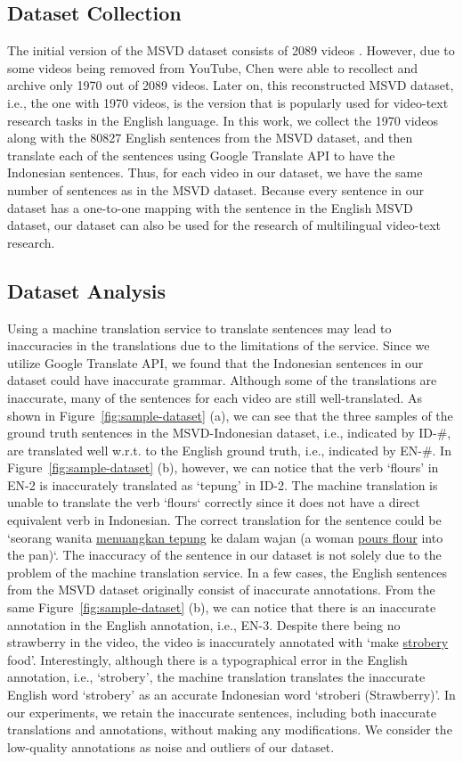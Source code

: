 \documentclass{article}
\begin{document}
\subsection{Dataset Collection}
The initial version of the MSVD dataset consists of 2089 videos \cite{chen:acl11}. However, due to some videos being removed from YouTube, Chen \etal were able to recollect and archive only 1970 out of 2089 videos. Later on, this reconstructed MSVD dataset, i.e., the one with 1970 videos, is the version that is popularly used for video-text research tasks in the English language. In this work, we collect the 1970 videos along with the 80827 English sentences from the MSVD dataset, and then translate each of the sentences using Google Translate API to have the Indonesian sentences. Thus, for each video in our dataset, we have the same number of sentences as in the MSVD dataset. Because every sentence in our dataset has a one-to-one mapping with the sentence in the English MSVD dataset, our dataset can also be used for the research of multilingual video-text research.

\subsection{Dataset Analysis}
Using a machine translation service to translate sentences may lead to inaccuracies in the translations due to the limitations of the service.  Since we utilize Google Translate API, we found that the Indonesian sentences in our dataset could have inaccurate grammar. Although some of the translations are inaccurate, many of the sentences for each video are still well-translated. As shown in Figure~\ref{fig:sample-dataset} (a), we can see that the three samples of the ground truth sentences in the MSVD-Indonesian dataset, i.e., indicated by ID-\#, are translated well w.r.t. to the English ground truth, i.e., indicated by EN-\#. In Figure~\ref{fig:sample-dataset} (b), however, we can notice that the verb `flours' in EN-2 is inaccurately translated as `tepung' in ID-2. The machine translation is unable to translate the verb `flours` correctly since it does not have a direct equivalent verb in Indonesian. The correct translation for the sentence could be `seorang wanita \underline{menuangkan tepung} ke dalam wajan (a woman \underline{pours flour} into the pan)`. The inaccuracy of the sentence in our dataset is not solely due to the problem of the machine translation service. In a few cases, the English sentences from the MSVD dataset originally consist of inaccurate annotations. From the same Figure~\ref{fig:sample-dataset} (b), we can notice that there is an inaccurate annotation in the English annotation, i.e., EN-3. Despite there being no strawberry in the video, the video is inaccurately annotated with `make \underline{strobery} food'. Interestingly, although there is a typographical error in the English annotation, i.e., `strobery', the machine translation translates the inaccurate English word `strobery' as an accurate Indonesian word `stroberi (Strawberry)'. In our experiments, we retain the inaccurate sentences, including both inaccurate translations and annotations, without making any modifications. We consider the low-quality annotations as noise and outliers of our dataset.
\end{document}
